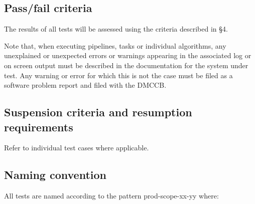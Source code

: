 \documentclass[DM,lsstdraft,STS,toc]{lsstdoc}
\begin{document}
\subsection{Pass/fail criteria}
\label{sec:passfail}

The results of all tests will be assessed using the criteria described in
 \S4.

Note that, when executing pipelines, tasks or individual algorithms, any
unexplained or unexpected errors or warnings appearing in the associated log
or on screen output must be described in the documentation for the system
under test. Any warning or error for which this is not the case must be filed
as a software problem report and filed with the DMCCB.

\subsection{Suspension criteria and resumption requirements}
\label{suspension}

Refer to individual test cases where applicable.

\subsection{Naming convention}

All tests are named according to the pattern prod-scope-xx-yy where:
\end{document}
